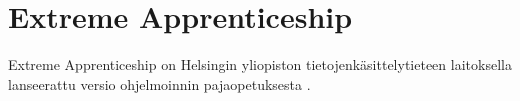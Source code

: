 \section{Extreme Apprenticeship}


Extreme Apprenticeship on Helsingin yliopiston tietojenkäsittelytieteen
laitoksella lanseerattu versio ohjelmoinnin pajaopetuksesta
\cite{Vihavainen:2011:EAM:1953163.1953196}.



